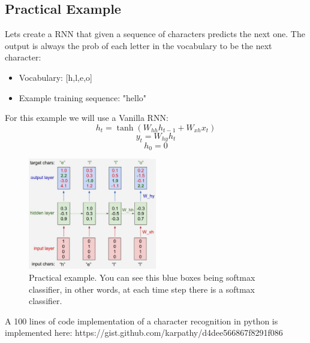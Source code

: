 \documentclass{article}
\begin{document}
	\subsection{Practical Example}
	
	Lets create a RNN that given a sequence of characters predicts the next one. The output is always the prob of each letter in the vocabulary to be the next character:
	\begin{itemize}
		\item Vocabulary: [h,l,e,o]
		\item Example training sequence: "hello"
	\end{itemize}
	
	For this example we will use a Vanilla RNN:
	\begin{equation}
	h_t = \tanh(W_{hh}h_{t-1}+W_{xh}x_t)
	\end{equation}
	\begin{equation}
	y_t = W_{hy}h_{t}
	\end{equation}
	\begin{equation}
	h_0 = 0
	\end{equation}
	
	\begin{figure}[h]
		\centering
		\includegraphics[width=0.5\textwidth]{Images/recurrent_neural_networks/10.png}
		\caption{Practical example. You can see this blue boxes being softmax classifier, in other words, at each time step there is a softmax classifier.}
		\label{fig:RNN_toghether}
	\end{figure}
	
	A 100 lines of code implementation of a character recognition in python is implemented here:
	https://gist.github.com/karpathy/d4dee566867f8291f086
	
\end{document}
